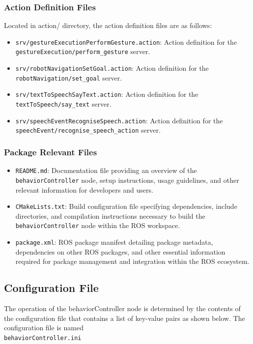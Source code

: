 \documentclass{CSSRforAfrica}
\begin{document}
\subsubsection{Action Definition Files}
Located in action/ directory, the action definition files are as follows:
\begin{itemize}
    \item \texttt{\small srv/\textnormal{gestureExecutionPerformGesture.action}}: Action definition for the
\\ \texttt{\small gestureExecution/perform\_gesture} server.
\item \texttt{\small srv/\textnormal{robotNavigationSetGoal.action}}: Action definition for the \texttt{\small robotNavigation/set\_goal} server.
\item \texttt{\small srv/\textnormal{textToSpeechSayText.action}}: Action definition for the \texttt{\small textToSpeech/say\_text} server.
\item \texttt{\small srv/\textnormal{speechEventRecogniseSpeech.action}}: Action definition for the 
\\ \texttt{\small speechEvent/recognise\_speech\_action} server.
\end{itemize}

\subsubsection{Package Relevant Files}
\begin{itemize}
    \item \texttt{\small README.md}: Documentation file providing an overview of the \texttt{\small behaviorController} node, setup instructions, usage guidelines, and other relevant information for developers and users.
    \item \texttt{\small CMakeLists.txt}: Build configuration file specifying dependencies, include directories, and compilation instructions necessary to build the \texttt{\small behaviorController} node within the ROS workspace.
    \item \texttt{\small package.xml}: ROS package manifest detailing package metadata, dependencies on other ROS packages, and other essential information required for package management and integration within the ROS ecosystem.
\end{itemize}

\newpage
\subsection{Configuration File}
The operation of the behaviorController node is determined by the contents of the configuration file that contains a list of key-value pairs as shown below.
The configuration file is named\\
\texttt{\small behaviorController.ini}
\end{document}
